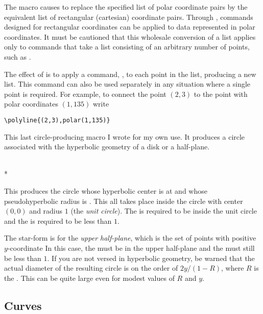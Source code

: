 \documentclass[letterpaper]{article}
\begin{document}
The macro  causes \MF{} to replace the specified list of polar
coordinate pairs by the equivalent list of rectangular (cartesian)
coordinate pairs. Through , commands designed for rectangular
coordinates can be applied to data represented in polar coordinates. It
must be cautioned that this wholesale conversion of a list applies only
to commands that take a list consisting of an arbitrary number of
points, such as .

The effect of  is to apply a \MF{} command, , to each
point in the list, producing a new list. This \MF{} command can also be
used separately in any situation where a single \MF{} point is required. For
example, to connect the point $(2,3)$ to the point with polar
coordinates $(1, 135)$ write
\begin{verbatim}
\polyline{(2,3),polar(1,135)}
\end{verbatim}

This last circle-producing macro I wrote for my own use. It produces a
circle associated with the hyperbolic geometry of a disk or a
half-plane.

\begin{cd}
\\
*%
%
\end{cd}

This produces the circle whose hyperbolic center is at  and
whose pseudohyperbolic radius is . This all takes place
inside the circle with center $(0,0)$ and radius $1$ (the \emph{unit
circle}). The  is required to be inside the unit circle and
the  is required to be less than $1$.

The star-form is for the \emph{upper half-plane}, which is the set of
points with positive $y$-coordinate In this case, the  must
be in the upper half-plane and the  must still be less than
$1$. If you are not versed in hyperbolic geometry, be warned that the
actual diameter of the resulting circle is on the order of $2y/(1-R)$,
where $R$ is the . This can be quite large even for modest
values of $R$ and $y$.


\subsection{Curves}\label{curves}
\end{document}
